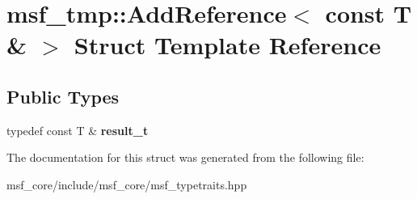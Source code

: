 \hypertarget{structmsf__tmp_1_1AddReference_3_01const_01T_01_6_01_4}{\section{msf\-\_\-tmp\-:\-:Add\-Reference$<$ const T \& $>$ Struct Template Reference}
\label{structmsf__tmp_1_1AddReference_3_01const_01T_01_6_01_4}
}
\subsection*{Public Types}
\begin{DoxyCompactItemize}
\item 
\hypertarget{structmsf__tmp_1_1AddReference_3_01const_01T_01_6_01_4_ae28a2491a76190e92e39dab2ad4e88f1}{typedef const T \& {\bfseries result\-\_\-t}}\label{structmsf__tmp_1_1AddReference_3_01const_01T_01_6_01_4_ae28a2491a76190e92e39dab2ad4e88f1}

\end{DoxyCompactItemize}


The documentation for this struct was generated from the following file\-:\begin{DoxyCompactItemize}
\item 
msf\-\_\-core/include/msf\-\_\-core/msf\-\_\-typetraits.\-hpp\end{DoxyCompactItemize}
